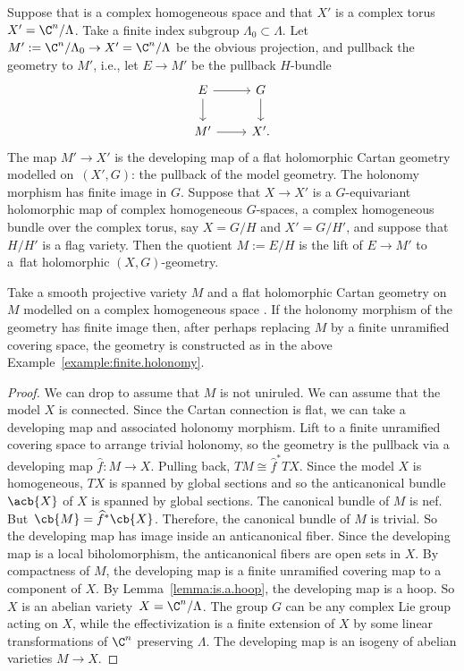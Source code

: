 \begin{Example}\label{example:finite.holonomy}
Suppose that  is a complex homogeneous space and that $X'$ is a complex torus $X' = \C^{n}/\Lambda$.
Take a finite index subgroup $\Lambda_0 \subset \Lambda$.
Let $M' := \C^{n}/\Lambda_0 \to X' = \C^{n}/\Lambda$ be the obvious projection, and pullback the geometry to $M'$, i.e., let $E \longrightarrow
 M'$ be the pullback $H$-bundle
\[
\begin{tikzcd}
E \arrow{r}\arrow{d} & G \arrow{d} \\
M' \arrow{r} & X'.
\end{tikzcd}
\]
The map $M' \longrightarrow
 X'$ is the developing map of a flat holomorphic Cartan geometry modelled on~$(X', G)$: the pullback of the model geometry.
The holonomy morphism has finite image in $G$.
Suppose that $X \to X'$ is a $G$-equivariant holomorphic map of complex homogeneous $G$-spaces, a complex
homogeneous bundle over the complex torus, say $X = G/H$ and $X' = G/H'$, and suppose that $H/H'$ is a flag variety.
Then the quotient $M := E/H$ is the lift of $E \to M'$ to a~flat holomorphic $(X, G)$-geometry.
\end{Example}

\begin{Theorem}\label{theorem:finite.holonomy}
Take a smooth projective variety $M$ and a flat holomorphic Cartan geometry on $M$ modelled on a complex homogeneous space .
If the holonomy morphism of the geometry has finite image then, after perhaps replacing $M$ by a finite unramified covering space, the geometry is constructed as in the above Example~{\rm \ref{example:finite.holonomy}}.
\end{Theorem}

\begin{proof}
We can drop to assume that $M$ is not uniruled.
We can assume that the model $X$ is connected.
Since the Cartan connection is flat, we can take a developing map and associated holonomy morphism.
Lift to a finite unramified covering space to arrange trivial holonomy, so the geometry is the pullback via a developing map
$\widehat{f} \colon M \to X$.
Pulling back, ${TM \cong \widehat{f}^* TX}$.
Since the model $X$ is homogeneous, $TX$ is spanned by global sections and so the anticanonical bundle~$\acb{X}$ of $X$ is spanned by global sections.
The canonical bundle of $M$ is nef.
But~${\cb{M} = \widehat{f}^* \cb{X}}$.
Therefore, the canonical bundle of $M$ is trivial.
So the developing map has image inside an anticanonical fiber.
Since the developing map is a local biholomorphism, the anticanonical fibers are open sets in $X$.
By compactness of $M$, the developing map is a finite unramified covering map to a component of $X$.
By Lemma~\ref{lemma:is.a.hoop}, the developing map is a hoop.
So $X$ is an abelian variety~${X = \C^{n}/\Lambda}$.
The group $G$ can be any complex Lie group acting on $X$, while the effectivization is a finite extension of $X$ by some linear transformations of $\C^{n}$ preserving $\Lambda$.
The developing map is an isogeny of abelian varieties $M \to X$.
\end{proof}


